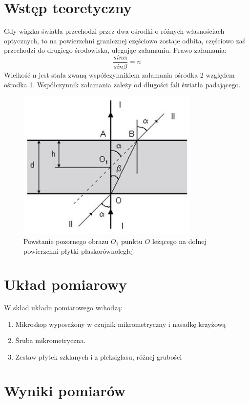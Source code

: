 \documentclass{article}
\begin{document}
\section{Wstęp teoretyczny}
Gdy wiązka światła przechodzi przez dwa ośrodki o różnych własnościach optycznych, to na powierzchni granicznej częściowo zostaje odbita, częściowo zaś przechodzi do drugiego środowiska, ulegając załamaniu.
Prawo załamania:
$$\frac{sin \alpha}{sin \beta} = n$$ 
Wielkość n jest stała zwaną współczynnikiem załamania ośrodka 2 względem ośrodka 1. 
Współczynnik załamania zależy od długości fali światła padającego. 
\begin{figure}[!htb]
	\centering
	\includegraphics[width=90mm]{image006.jpg}
	\caption{Powstanie  pozornego  obrazu  $O_{1}$ punktu  $O$  leżącego  na  dolnej  powierzchni płytki płaskorównoległej }
\end{figure}

\clearpage
\section{Układ pomiarowy}
W skład układu pomiarowego wchodzą: 
\begin{enumerate}
\item Mikroskop wyposażony w czujnik mikrometryczny i nasadkę krzyżową
\item Śruba mikrometryczna. 
\item Zestaw płytek szklanych i z pleksiglasu, różnej grubości
\end{enumerate}
\section{Wyniki pomiarów}
\end{document}
